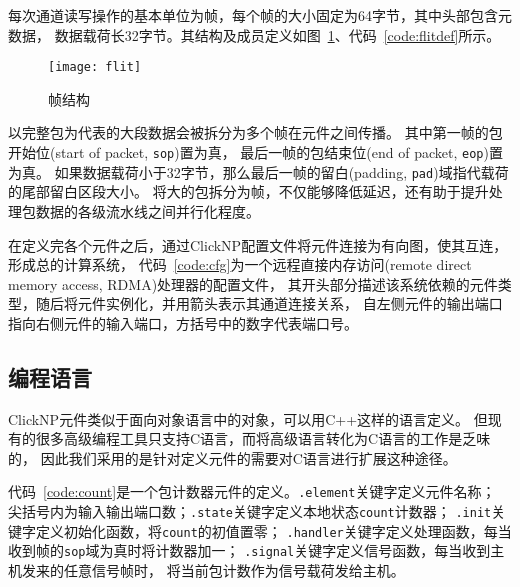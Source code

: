每次通道读写操作的基本单位为帧，每个帧的大小固定为64字节，其中头部包含元数据，
数据载荷长32字节。其结构及成员定义如图~\ref{fig:flit}、代码~\ref{code:flitdef}所示。
\begin{figure}[ht]
\centering
\texttt{[image: flit]}
\caption{帧结构} \label{fig:flit}
\end{figure}



以完整包为代表的大段数据会被拆分为多个帧在元件之间传播。
其中第一帧的包开始位(start of packet, \lstinline$sop$)置为真，
最后一帧的包结束位(end of packet, \lstinline$eop$)置为真。
如果数据载荷小于32字节，那么最后一帧的留白(padding, \lstinline$pad$)域指代载荷的尾部留白区段大小。
将大的包拆分为帧，不仅能够降低延迟，还有助于提升处理包数据的各级流水线之间并行化程度。

在定义完各个元件之后，通过ClickNP配置文件将元件连接为有向图，使其互连，形成总的计算系统，
代码~\ref{code:cfg}为一个远程直接内存访问(remote direct memory access, RDMA)处理器的配置文件，
其开头部分描述该系统依赖的元件类型，随后将元件实例化，并用箭头表示其通道连接关系，
自左侧元件的输出端口指向右侧元件的输入端口，方括号中的数字代表端口号。
\begin{figure}[ht]
\centering

\end{figure}

\subsection{编程语言}
ClickNP元件类似于面向对象语言中的对象，可以用C++这样的语言定义。
但现有的很多高级编程工具只支持C语言，而将高级语言转化为C语言的工作是乏味的，
因此我们采用的是针对定义元件的需要对C语言进行扩展这种途径。

代码~\ref{code:count}是一个包计数器元件的定义。\lstinline$.element$关键字定义元件名称；
尖括号内为输入输出端口数；\lstinline$.state$关键字定义本地状态\lstinline$count$计数器；
\lstinline$.init$关键字定义初始化函数，将\lstinline$count$的初值置零；
\lstinline$.handler$关键字定义处理函数，每当收到帧的\lstinline$sop$域为真时将计数器加一；
\lstinline$.signal$关键字定义信号函数，每当收到主机发来的任意信号帧时，
将当前包计数作为信号载荷发给主机。



